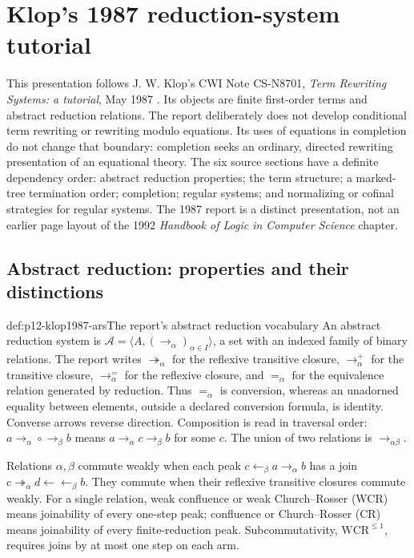 \section{Klop's 1987 reduction-system tutorial}
\label{sec:p12-src-027-501}

This presentation follows J. W. Klop's CWI Note CS-N8701,
\emph{Term Rewriting Systems: a tutorial}, May 1987
\parencite{Klop1987CWITutorial}. Its objects are finite first-order terms
and abstract reduction relations. The report deliberately does not develop
conditional term rewriting or rewriting modulo equations. Its uses of
equations in completion do not change that boundary: completion seeks an
ordinary, directed rewriting presentation of an equational theory.
The six source sections have a definite dependency order: abstract reduction
properties; the term structure; a marked-tree termination order; completion;
regular systems; and normalizing or cofinal strategies for regular systems.
The 1987 report is a distinct presentation, not an earlier page layout of the
1992 \emph{Handbook of Logic in Computer Science} chapter.

\subsection{Abstract reduction: properties and their distinctions}

\begin{hbdefinition}{def:p12-klop1987-ars}{The report's abstract reduction vocabulary}
An abstract reduction system is
\(\mathcal A=\langle A,(\to_\alpha)_{\alpha\in I}\rangle\), a set with
an indexed family of binary relations. The report writes
\(\twoheadrightarrow_\alpha\) for the reflexive transitive closure,
\(\to_\alpha^+\) for the transitive closure, \(\to_\alpha^=\) for the
reflexive closure, and \(=_\alpha\) for the equivalence relation generated
by reduction. Thus \(=_\alpha\) is conversion, whereas an unadorned equality
between elements, outside a declared conversion formula, is identity.
Converse arrows reverse direction. Composition is read in traversal order:
\(a\to_\alpha\circ\to_\beta b\) means
\(a\to_\alpha c\to_\beta b\) for some \(c\).
The union of two relations is \(\to_{\alpha\beta}\).

Relations \(\alpha,\beta\) commute weakly when each peak
\(c\leftarrow_\beta a\to_\alpha b\) has a join
\(c\twoheadrightarrow_\alpha d\leftarrow\!\!\leftarrow_\beta b\).
They commute when their reflexive transitive closures commute weakly.
For a single relation, weak confluence or weak Church--Rosser (WCR)
means joinability of every one-step peak; confluence or Church--Rosser
(CR) means joinability of every finite-reduction peak.
Subcommutativity, \(\mathrm{WCR}^{\leq1}\), requires joins by at most
one step on each arm.
\end{hbdefinition}

